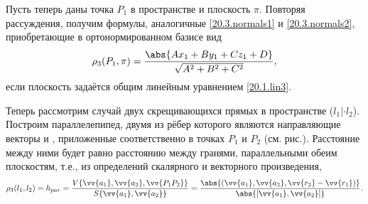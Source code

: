   Пусть теперь даны точка $P_1$ в пространстве и плоскость $\pi$. Повторяя рассуждения, получим формулы, аналогичные \eqref{20.3.normals1} и \eqref{20.3.normals2}, приобретающие в ортонормированном базисе вид
  \begin{equation}
  \rho_3 (P_1,\pi) = \dfrac{\abs{Ax_1+By_1+Cz_1+D}}{\sqrt{A^2+B^2+C^2}},
  \end{equation}
  если плоскость задаётся общим линейным уравнением \eqref{20.1.lin3}.

  Теперь рассмотрим случай двух скрещивающихся прямых в пространстве ($l_1|\cdot l_2$). Построим параллелепипед, двумя из рёбер которого являются направляющие векторы  и , приложенные соответственно в точках $P_1$ и $P_2$ (см. рис.). Расстояние между ними будет равно расстоянию между гранями, параллельными обеим плоскостям, т.е., из определений скалярного и векторного произведения,
  \begin{equation}
  \rho_3(l_1,l_2)=h_{par}=\dfrac{V \lbrace \vv{a_1},\vv{a_2},\vv{P_1P_2} \rbrace}{S \lbrace \vv{a_1},\vv{a_2} \rbrace}=\dfrac{\abs{(\vv{a_1},\vv{a_2},\vv{r_2}-\vv{r_1})}}{\abs{[\vv{a_1},\vv{a_2}]}}.
  \end{equation}   
\label{ch20pict3}